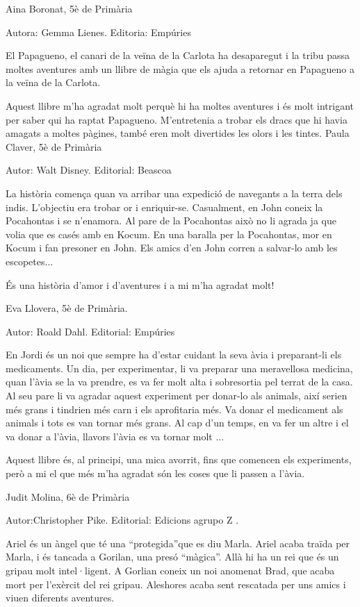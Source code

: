 \begin{shortnews}
{Aina Boronat, 5è de Primària
}

{
Autora: Gemma Lienes.    Editoria: Empúries

El Papagueno, el canari de la veïna de la Carlota ha desaparegut i la tribu passa moltes aventures amb un llibre de màgia que els ajuda a retornar en Papagueno a la veïna de la Carlota.  

Aquest  llibre m’ha agradat molt perquè hi ha moltes aventures i és molt intrigant per saber qui ha raptat Papagueno. M’entretenia a trobar els dracs que hi havia amagats a moltes pàgines, també eren molt divertides les olors i les tintes.  
Paula Claver, 5è de Primària
}

{
Autor: Walt Disney.   Editorial: Beascoa

La història comença quan va arribar una expedició de navegants a la terra dels indis.
L’objectiu era trobar or i enriquir-se. Casualment, en John coneix la Pocahontas i se n’enamora. Al pare de la Pocahontas  això no li agrada ja que volia que es casés amb en Kocum. En una baralla per la Pocahontas, mor en Kocum i fan presoner en John. Els amics d’en John corren a salvar-lo amb les escopetes...

És una història d’amor i d’aventures i a mi m’ha agradat molt!

Eva Llovera, 5è de Primària.
}


{
Autor: Roald Dahl.   Editorial: Empúries

En Jordi és un noi que  sempre ha d’estar cuidant la seva àvia i preparant-li els medicaments. Un dia, per experimentar,  li va preparar  una meravellosa medicina, quan l’àvia se la va prendre, es va fer molt alta i sobresortia pel terrat de la casa. Al seu pare li va agradar aquest experiment per donar-lo als animals, així serien més grans i tindrien més carn i els aprofitaria més. Va donar el medicament als animals i tots es van tornar  més grans. Al cap d’un temps, en va fer un altre i el va donar a l’àvia, llavors l’àvia es va tornar molt ...  

Aquest llibre és, al principi, una mica avorrit, fins que  comencen els experiments, però a mi el que més m’ha agradat són les coses que li passen a l’àvia.

Judit Molina, 6è de Primària
}

{
Autor:Christopher Pike. Editorial: Edicions  agrupo  Z .

Ariel és un àngel que té una “protegida”que es diu Marla. Ariel acaba traïda per Marla, i és tancada a Gorilan, una presó “màgica”. Allà hi ha un rei que és un gripau molt intel·ligent. A Gorlian coneix un noi anomenat Brad, que acaba mort per l’exèrcit del rei gripau. Aleshores acaba sent rescatada per uns amics i viuen diferents aventures.

}
\end{shortnews}
